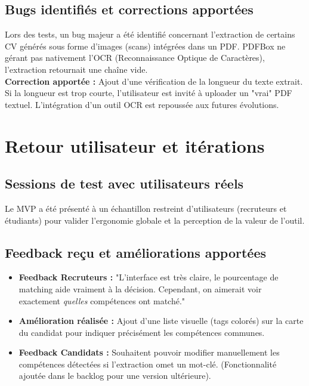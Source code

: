 \documentclass[12pt,a4paper]{report}
\begin{document}
\begin{itemize}
\subsection{Bugs identifiés et corrections apportées}
Lors des tests, un bug majeur a été identifié concernant l'extraction de certains CV générés sous forme d'images (scans) intégrées dans un PDF. PDFBox ne gérant pas nativement l'OCR (Reconnaissance Optique de Caractères), l'extraction retournait une chaîne vide. \\
\textbf{Correction apportée :} Ajout d'une vérification de la longueur du texte extrait. Si la longueur est trop courte, l'utilisateur est invité à uploader un "vrai" PDF textuel. L'intégration d'un outil OCR est repoussée aux futures évolutions.

\section{Retour utilisateur et itérations}

\subsection{Sessions de test avec utilisateurs réels}
Le MVP a été présenté à un échantillon restreint d'utilisateurs (recruteurs et étudiants) pour valider l'ergonomie globale et la perception de la valeur de l'outil.

\subsection{Feedback reçu et améliorations apportées}
\begin{itemize}
    \item \textbf{Feedback Recruteurs :} "L'interface est très claire, le pourcentage de matching aide vraiment à la décision. Cependant, on aimerait voir exactement \textit{quelles} compétences ont matché."
    \item \textbf{Amélioration réalisée :} Ajout d'une liste visuelle (tags colorés) sur la carte du candidat pour indiquer précisément les compétences communes.
    \item \textbf{Feedback Candidats :} Souhaitent pouvoir modifier manuellement les compétences détectées si l'extraction omet un mot-clé. (Fonctionnalité ajoutée dans le backlog pour une version ultérieure).
\end{itemize}


\end{itemize}
\end{document}
